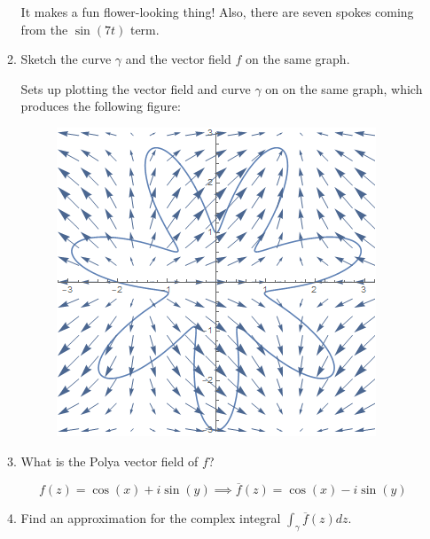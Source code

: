 \documentclass{article}
\begin{document}
\begin{enumerate}
\begin{enumerate}
		It makes a fun flower-looking thing! Also, there are seven spokes coming from the $\sin(7t)$ term.
		
		\item Sketch the curve $\gamma$ and the vector field $f$ on the same graph.
		
		
		
		
		Sets up plotting the vector field and curve $\gamma$ on on the same graph, which produces the following figure:
		
		\begin{figure}[H]
		\includegraphics[scale=0.7]{image2.png}
		\end{figure}
		
		\item What is the Polya vector field of $f$?
		
		\[f(z)=\cos(x)+i\sin(y) \implies \overline{f}(z)=\cos(x)-i\sin(y)\]
		
		\item Find an approximation for the complex integral $\int_{\gamma}\overline{f}(z)dz.$
		
		
		
		
		

\end{enumerate}
\end{enumerate}
\end{document}
